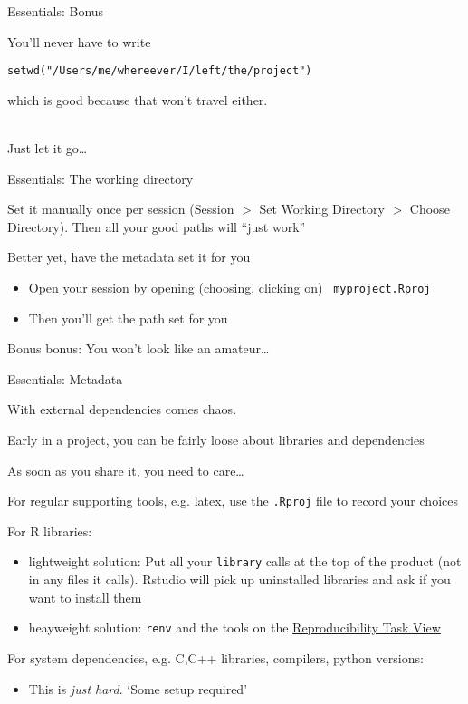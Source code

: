 \documentclass{hertieteaching}
\begin{document}
\begin{frame}[fragile]{Essentials: Bonus}

You'll never have to write 
\begin{verbatim}
setwd("/Users/me/whereever/I/left/the/project")
\end{verbatim}
which is good because that won't travel either.

~\\
Just let it go\ldots

\end{frame}
\begin{frame}{Essentials: The working directory}
  
Set it manually once per session (\textsf{Session $>$ Set Working Directory $>$ Choose Directory}). Then all your good paths will ``just work''

Better yet, have the metadata set it for you
\begin{itemize}
  \item Open your session by opening (choosing, clicking on) ~\texttt{myproject.Rproj}
  \item Then you'll get the path set for you
\end{itemize}

Bonus bonus: You won't look like an amateur\ldots

\end{frame}
\begin{frame}{Essentials: Metadata}

With external dependencies comes chaos.

Early in a project, you can be fairly loose about libraries and dependencies

As soon as you share it, you need to care\ldots

For regular supporting tools, e.g. latex, use the \texttt{.Rproj} file to record your choices

For R libraries:
\begin{itemize}
  \item lightweight solution: Put all your \texttt{library} calls at the top of the product (not in any files it calls).
  Rstudio will pick up uninstalled libraries and ask if you want to install them
  \item heayweight solution: \texttt{renv} and the tools on the \href{https://cran.r-project.org/web/views/ReproducibleResearch.html}{Reproducibility Task View}
\end{itemize}

For system dependencies, e.g. \textsf{C,C++} libraries, compilers, python versions: 
\begin{itemize}
  \item This is \textit{just hard}. `Some setup required'
\end{itemize}



\end{frame}
\end{document}
